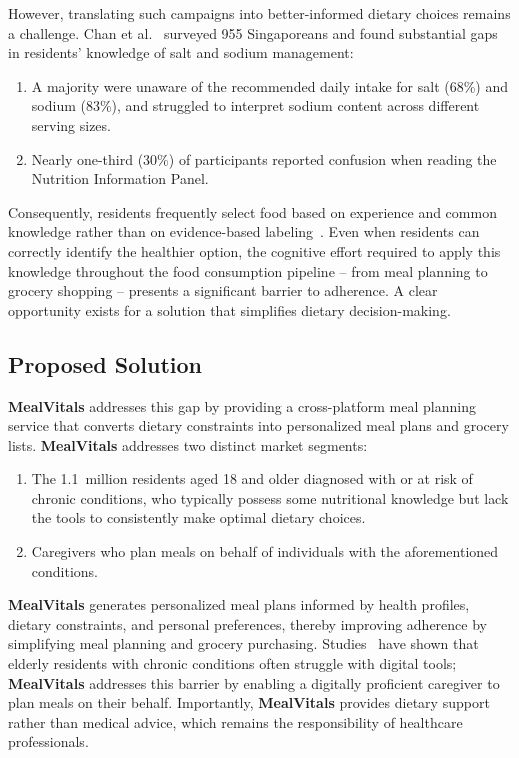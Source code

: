\documentclass[conference]{IEEEtran}
\begin{document}
However, translating such campaigns into better-informed dietary choices remains a challenge. Chan et al.~\cite{b3} surveyed 955 Singaporeans and found substantial gaps in residents' knowledge of salt and sodium management:
\begin{enumerate}
    \item A majority were unaware of the recommended daily intake for salt (68\%) and sodium (83\%), and struggled to interpret sodium content across different serving sizes.
    \item Nearly one-third (30\%) of participants reported confusion when reading the Nutrition Information Panel.
\end{enumerate}

Consequently, residents frequently select food based on experience and common knowledge rather than on evidence-based labeling~\cite{b3}. Even when residents can correctly identify the healthier option, the cognitive effort required to apply this knowledge throughout the food consumption pipeline -- from meal planning to grocery shopping -- presents a significant barrier to adherence. A clear opportunity exists for a solution that simplifies dietary decision-making.

\subsection{Proposed Solution}

\textbf{MealVitals} addresses this gap by providing a cross-platform meal planning service that converts dietary constraints into personalized meal plans and grocery lists. \textbf{MealVitals} addresses two distinct market segments:
\begin{enumerate}
    \item The 1.1~million residents aged 18 and older diagnosed with or at risk of chronic conditions, who typically possess some nutritional knowledge but lack the tools to consistently make optimal dietary choices.
    \item Caregivers who plan meals on behalf of individuals with the aforementioned conditions.
\end{enumerate}

\textbf{MealVitals} generates personalized meal plans informed by health profiles, dietary constraints, and personal preferences, thereby improving adherence by simplifying meal planning and grocery purchasing. Studies~\cite{b4} have shown that elderly residents with chronic conditions often struggle with digital tools; \textbf{MealVitals} addresses this barrier by enabling a digitally proficient caregiver to plan meals on their behalf. Importantly, \textbf{MealVitals} provides dietary support rather than medical advice, which remains the responsibility of healthcare professionals.
\end{document}

